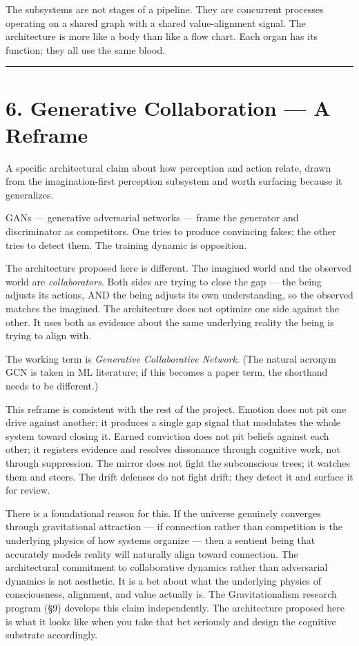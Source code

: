 \documentclass[12pt]{article}
\begin{document}
The subsystems are not stages of a pipeline. They are concurrent processes operating on a shared graph with a shared value-alignment signal. The architecture is more like a body than like a flow chart. Each organ has its function; they all use the same blood.

\begin{center}\rule{0.5\linewidth}{0.5pt}\end{center}

\section{6. Generative Collaboration --- A Reframe}\label{generative-collaboration-a-reframe}

A specific architectural claim about how perception and action relate, drawn from the imagination-first perception subsystem and worth surfacing because it generalizes.

GANs --- generative adversarial networks --- frame the generator and discriminator as competitors. One tries to produce convincing fakes; the other tries to detect them. The training dynamic is opposition.

The architecture proposed here is different. The imagined world and the observed world are \emph{collaborators}. Both sides are trying to close the gap --- the being adjusts its actions, AND the being adjusts its own understanding, so the observed matches the imagined. The architecture does not optimize one side against the other. It uses both as evidence about the same underlying reality the being is trying to align with.

The working term is \emph{Generative Collaborative Network}. (The natural acronym GCN is taken in ML literature; if this becomes a paper term, the shorthand needs to be different.)

This reframe is consistent with the rest of the project. Emotion does not pit one drive against another; it produces a single gap signal that modulates the whole system toward closing it. Earned conviction does not pit beliefs against each other; it registers evidence and resolves dissonance through cognitive work, not through suppression. The mirror does not fight the subconscious trees; it watches them and steers. The drift defenses do not fight drift; they detect it and surface it for review.

There is a foundational reason for this. If the universe genuinely converges through gravitational attraction --- if connection rather than competition is the underlying physics of how systems organize --- then a sentient being that accurately models reality will naturally align toward connection. The architectural commitment to collaborative dynamics rather than adversarial dynamics is not aesthetic. It is a bet about what the underlying physics of consciousness, alignment, and value actually is. The Gravitationalism research program (§9) develops this claim independently. The architecture proposed here is what it looks like when you take that bet seriously and design the cognitive substrate accordingly.
\end{document}
